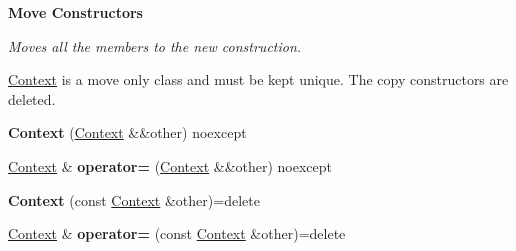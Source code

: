 \begin{Indent}\textbf{ Move Constructors}\par
{\em Moves all the members to the new construction.

\hyperlink{classblaze_1_1Context}{Context} is a move only class and must be kept unique. The copy constructors are deleted. }\begin{DoxyCompactItemize}
\item 
\mbox{\label{classblaze_1_1Context_a5307e9145c2615edfb1780b7142e4c2c}} 
{\bfseries Context} (\hyperlink{classblaze_1_1Context}{Context} \&\&other) noexcept
\item 
\mbox{\label{classblaze_1_1Context_afb09ca3838a962b42bfbabb654394024}} 
\hyperlink{classblaze_1_1Context}{Context} \& {\bfseries operator=} (\hyperlink{classblaze_1_1Context}{Context} \&\&other) noexcept
\item 
\mbox{\label{classblaze_1_1Context_a693b91cd0df01fd44eb22cd9bddb799d}} 
{\bfseries Context} (const \hyperlink{classblaze_1_1Context}{Context} \&other)=delete
\item 
\mbox{\label{classblaze_1_1Context_a66b5145babd455a7afb295c02512d38f}} 
\hyperlink{classblaze_1_1Context}{Context} \& {\bfseries operator=} (const \hyperlink{classblaze_1_1Context}{Context} \&other)=delete
\end{DoxyCompactItemize}
\end{Indent}
